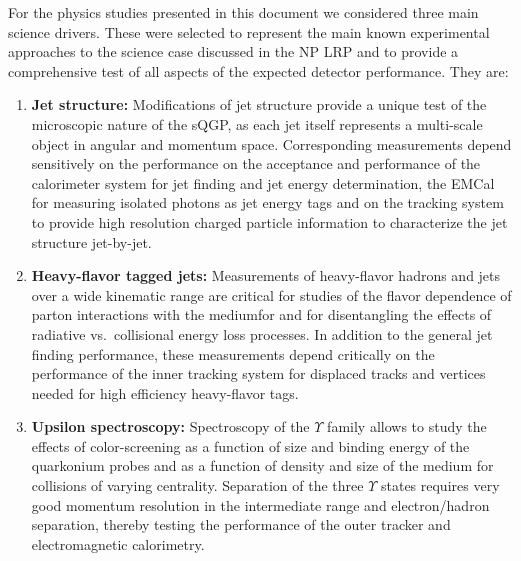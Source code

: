 For the physics studies presented in this document we considered three
main science drivers. These were selected to represent the main known 
experimental approaches to the science case discussed in the NP LRP and
to provide a comprehensive test of all aspects of the expected detector
performance. They are:
\begin{enumerate}
\item {\bf Jet structure:} Modifications of jet structure provide a unique test
of the microscopic nature of the sQGP, as each jet itself represents a multi-scale
object in angular and momentum space. Corresponding measurements depend
sensitively on the performance on the acceptance and performance 
of the calorimeter system for jet finding and jet energy determination, the
EMCal for measuring isolated photons as jet energy tags and on the tracking
system to provide high resolution charged particle information to characterize
the jet structure jet-by-jet.
\item {\bf Heavy-flavor tagged jets:} Measurements of heavy-flavor hadrons 
and jets over a wide kinematic range are critical for studies of
the flavor dependence of parton interactions with the mediumfor and for 
disentangling the effects of radiative vs.\ collisional energy loss processes.
In addition to the general jet finding performance, these measurements depend 
critically on the performance of the inner tracking system for displaced 
tracks and vertices needed for high efficiency heavy-flavor tags.
\item {\bf Upsilon spectroscopy:} Spectroscopy of the $\Upsilon$ family allows
to study the effects of color-screening as a function of size and 
binding energy of the quarkonium probes and as a function of density and size
of the medium for collisions of varying centrality. Separation of the three 
$\Upsilon$ states requires very good momentum resolution in the intermediate
\pt range and electron/hadron separation, thereby testing the performance of 
the outer tracker and electromagnetic calorimetry. 
\end{enumerate}






